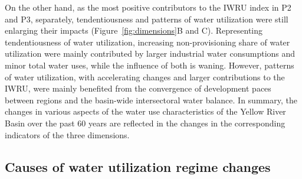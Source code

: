 \documentclass[9pt, twocolumn, twoside, lineno]{pnas-new}
\begin{document}
On the other hand, as the most positive contributors to the IWRU index in P2 and P3, separately, 
tendentiousness and patterns of water utilization were still enlarging their impacts (Figure~\ref{fig:dimensions}B and C). 
Representing tendentiousness of water utilization, 
increasing non-provisioning share of water utilization were mainly contributed by larger industrial water consumptions and minor total water uses, 
while the influence of both is waning.
However, patterns of water utilization, with accelerating changes and larger contributions to the IWRU, 
were mainly benefited from the convergence of development paces between regions and the basin-wide intersectoral water balance.
In summary, the changes in various aspects of the water use characteristics of the Yellow River Basin over the past 60 years 
are reflected in the changes in the corresponding indicators of the three dimensions.

\subsection*{Causes of water utilization regime changes}
\end{document}
